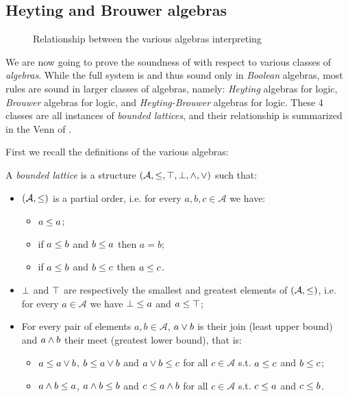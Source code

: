 \subsection{Heyting and Brouwer algebras}

\begin{figure*}
  \caption{Relationship between the various algebras interpreting }
\end{figure*}

We are now going to prove the soundness of  with respect to
various classes of \emph{algebras}. While the full system is  and thus
sound only in \emph{Boolean} algebras, most rules are sound in larger classes of
algebras, namely: \emph{Heyting} algebras for  logic,
\emph{Brouwer} algebras for  logic, and
\emph{Heyting-Brouwer} algebras for  logic. These 4 classes are
all instances of \emph{bounded lattices}, and their relationship is summarized
in the Venn  of .

First we recall the definitions of the various algebras:

\begin{definition}
  A \emph{bounded lattice} is a structure $(\mathcal{A}, \leq, \top, \bot, \land,
  \lor)$ such that:
  \begin{itemize}
    \item $(\mathcal{A}, \leq)$ is a partial order, i.e. for every $a, b, c
    \in \mathcal{A}$ we have:
      \begin{itemize}
        \item $a \leq a$;
        \item if $a \leq b$ and $b \leq a$ then $a = b$;
        \item if $a \leq b$ and $b \leq c$ then $a \leq c$.
      \end{itemize}
    \item $\bot$ and $\top$ are respectively the smallest and greatest
    elements of $(\mathcal{A}, \leq)$, i.e. for every $a \in \mathcal{A}$ we
    have $\bot \leq a$ and $a \leq \top$;
    \item For every pair of elements $a, b \in \mathcal{A}$, $a \lor b$ is
    their join (least upper bound) and $a \land b$ their meet (greatest lower
    bound), that is:
    \begin{itemize}
      \item $a \leq a \lor b$, $b \leq a \lor b$ and $a \lor b \leq c$ for all $c \in \mathcal{A}$ s.t. $a \leq c$ and $b \leq c$;
      \item $a \land b \leq a$, $a \land b \leq b$ and $c \leq a \land b$ for all $c \in \mathcal{A}$ s.t. $c \leq a$ and $c \leq b$.
    \end{itemize}
  \end{itemize}
\end{definition}

